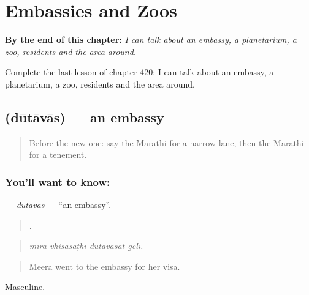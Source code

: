 
\chapter{Embassies and Zoos}
\label{ch:mr-embassies-and-zoos}

\begin{chapteropening}
\textbf{By the end of this chapter:} \emph{I can talk about an embassy, a planetarium, a zoo, residents and the area around.}

Complete the last lesson of chapter 420: I can talk about an embassy, a planetarium, a zoo, residents and the area around.
\end{chapteropening}

\section[\texorpdfstring{\mr{दूतावास} (dūtāvās)}{दूतावास (dūtāvās)}]{ (dūtāvās) — an embassy}

\label{lesson:MR-C420-dutavas}



\begin{quote}
Before the new one: say the Marathi for a narrow lane, then the Marathi for a tenement.
\end{quote}

\subsection*{You'll want to know: }
\textbf{} — \emph{dūtāvās} — \textquotedblleft{}an embassy\textquotedblright{}.

\begin{quote}
   .
\end{quote}

\begin{quote}
\emph{mīrā vhisāsāṭhī dūtāvāsāt gelī.}
\end{quote}

\begin{quote}
Meera went to the embassy for her visa.
\end{quote}

Masculine.

